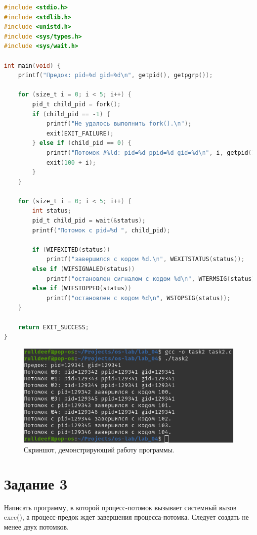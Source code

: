 \begin{lstlisting}[language=C,caption=Исходный код для задания 2.]
#include <stdio.h>
#include <stdlib.h>
#include <unistd.h>
#include <sys/types.h>
#include <sys/wait.h>

int main(void) {
	printf("Предок: pid=%d gid=%d\n", getpid(), getpgrp());
	
	for (size_t i = 0; i < 5; i++) {
		pid_t child_pid = fork();
		if (child_pid == -1) {
			printf("Не удалось выполнить fork().\n");
			exit(EXIT_FAILURE);
		} else if (child_pid == 0) {
			printf("Потомок #%ld: pid=%d ppid=%d gid=%d\n", i, getpid(), getppid(), getpgrp());
			exit(100 + i);
		}
	}
	
	for (size_t i = 0; i < 5; i++) {
		int status;
		pid_t child_pid = wait(&status);
		printf("Потомок с pid=%d ", child_pid);
		
		if (WIFEXITED(status))
			printf("завершился с кодом %d.\n", WEXITSTATUS(status));
		else if (WIFSIGNALED(status))
			printf("остановлен сигналом с кодом %d\n", WTERMSIG(status));
		else if (WIFSTOPPED(status))
			printf("остановлен с кодом %d\n", WSTOPSIG(status));
	}
	
	return EXIT_SUCCESS;
}
\end{lstlisting}

\begin{figure}[ht]
	\centering
	\includegraphics[width=\linewidth]{img/task2.png}
	\caption{Скриншот, демонстрирующий работу программы.}
\end{figure}

\clearpage

\section{Задание 3}

Написать программу, в которой процесс-потомок вызывает системный вызов exec(), а процесс-предок ждет завершения процесса-потомка. Следует создать не менее двух потомков.

